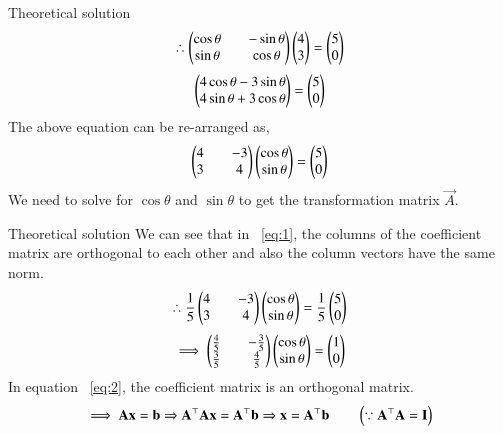 \documentclass{beamer}
\begin{document}
\begin{frame}{Theoretical solution}
    \begin{align}
    \therefore \begin{pmatrix}\cos{\theta}&&-\sin{\theta}\\\sin{\theta}&&\cos{\theta}\end{pmatrix}\begin{pmatrix}4\\3\end{pmatrix}=\begin{pmatrix}5\\0\end{pmatrix}
\end{align}
\begin{align}
    \begin{pmatrix}4\cos{\theta}-3\sin{\theta}\\4\sin{\theta}+3\cos{\theta}\end{pmatrix}=\begin{pmatrix}5\\0\end{pmatrix}
\end{align}
The above equation can be re-arranged as,
\begin{align}
    \begin{pmatrix}4&&-3\\3&&4\end{pmatrix}\begin{pmatrix}\cos{\theta}\\\sin{\theta}\end{pmatrix}=\begin{pmatrix}5\\0\end{pmatrix}
    \label{eq:1}
\end{align}
We need to solve for $\cos{\theta}$ and $\sin{\theta}$ to get the transformation matrix $\vec{A}$.
\end{frame}

\begin{frame}{Theoretical solution}
We can see that in ~\eqref{eq:1}, the columns of the coefficient matrix are orthogonal to each other and also the column vectors have the same norm.
\begin{align}
    \therefore \frac{1}{5}\begin{pmatrix}4&&-3\\3&&4\end{pmatrix}\begin{pmatrix}\cos{\theta}\\\sin{\theta}\end{pmatrix}=\frac{1}{5}\begin{pmatrix}5\\0\end{pmatrix}
\end{align}
\begin{align}
    \implies \begin{pmatrix}\tfrac{4}{5}&&-\tfrac{3}{5}\\\tfrac{3}{5}&&\tfrac{4}{5}\end{pmatrix}\begin{pmatrix}\cos{\theta}\\\sin{\theta}\end{pmatrix}=\begin{pmatrix}1\\0\end{pmatrix}
    \label{eq:2}
\end{align}
In equation ~\eqref{eq:2}, the coefficient matrix is an orthogonal matrix.
\begin{align}
    \implies \mathbf{A}\mathbf{x}=\mathbf{b} 
    \Rightarrow 
    \mathbf{A}^{\top}\mathbf{A}\mathbf{x}=\mathbf{A}^{\top}\mathbf{b}
    \Rightarrow
    \mathbf{x}=\mathbf{A}^{\top}\mathbf{b} \qquad \left(\because \mathbf{A}^{\top}\mathbf{A}=\mathbf{I}\right)
\end{align}
\end{frame}
\end{document}
